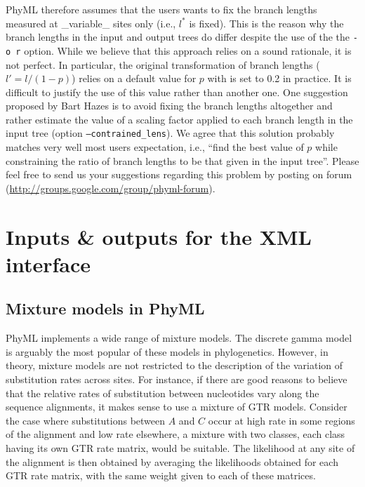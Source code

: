 \documentclass[a4paper,12pt]{article}
\newcommand{\x}[1]{\texttt{#1}}
\begin{document}
PhyML therefore  assumes that the  users wants  to fix the  branch lengths measured  at \_variable\_
sites only  (i.e., $l^{*}$ is  fixed). This is the  reason why the  branch lengths in the  input and
output trees  do differ  despite the  use of the  the \x{-o  r} option. While  we believe  that this
approach relies on a sound rationale, it  is not perfect. In particular, the original transformation
of  branch lengths  ($l' =  l/(1-p)$) relies  on a  default  value for  $p$ with  is set  to 0.2  in
practice. It is difficult  to justify the use of this value rather  than another one. One suggestion
proposed by  Bart Hazes is  to avoid fixing  the branch lengths  altogether and rather  estimate the
value  of   a  scaling  factor   applied  to   each  branch  length   in  the  input   tree  (option
\x{--contrained\_lens}).  We  agree  that  this  solution  probably matches  very  well  most  users
expectation, i.e., ``find the  best value of $p$ while constraining the ratio  of branch lengths to be
that given in the input tree''. Please feel free to send us your suggestions regarding this problem
by posting on forum (\url{http://groups.google.com/group/phyml-forum}).


\section{Inputs \& outputs for the XML interface }\label{sec:xmlio}

\subsection{Mixture models in PhyML}\label{sec:mixtures}

PhyML implements a wide range of mixture models. The discrete gamma model \cite{yang94b} is arguably
the  most popular  of these  models in  phylogenetics. However,  in theory,  mixture models  are not
restricted to the description of the variation  of substitution rates across sites. For instance, if
there are good reasons  to believe that the relative rates of  substitution between nucleotides vary
along the  sequence alignments, it  makes sense to  use a mixture of  GTR models. Consider  the case
where substitutions between $A$ and $C$ occur at  high rate in some regions of the alignment and low
rate elsewhere,  a mixture with two  classes, each class having  its own GTR rate  matrix, would be
suitable. The likelihood at any site of  the alignment is then obtained by averaging the likelihoods
obtained for each GTR rate matrix, with the same weight given to each of these matrices.
\end{document}
